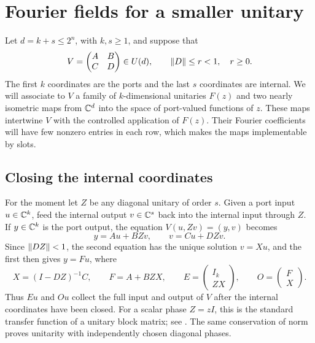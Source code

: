 \section{Fourier fields for a smaller unitary}\label{sec:fields}

Let $d=k+s\le 2^n$, with $k,s\ge1$, and suppose that
\begin{equation}\label{fields:block}
 V=\begin{pmatrix}A&B\\ C&D\end{pmatrix}\in U(d),
 \qquad \lVert D\rVert\le r<1,\quad r\ge0.
\end{equation}
The first $k$ coordinates are the ports and the last $s$ coordinates are
internal. We will associate to $V$ a family of $k$-dimensional unitaries
$F(z)$ and two nearly isometric maps from $\mathbb C^d$ into the space of
port-valued functions of $z$. These maps intertwine $V$ with the controlled
application of $F(z)$. Their Fourier coefficients will have few nonzero
entries in each row, which makes the maps implementable by slots.

\subsection{Closing the internal coordinates}

For the moment let $Z$ be any diagonal unitary of order $s$. Given a port
input $u\in\mathbb C^k$, feed the internal output $v\in\mathbb C^s$ back into the
internal input through $Z$. If $y\in\mathbb C^k$ is the port output, the equation
$V(u,Zv)=(y,v)$ becomes
\[
 y=Au+BZv,\qquad v=Cu+DZv.
\]
Since $\lVert DZ\rVert<1$, the second equation has the unique solution $v=Xu$,
and the first then gives $y=Fu$, where
\begin{equation}\label{fields:feedback}
 X=(I-DZ)^{-1}C,\qquad F=A+BZX,
 \qquad
 E=\begin{pmatrix}I_k\\ ZX\end{pmatrix},\qquad
 O=\begin{pmatrix}F\\ X\end{pmatrix}.
\end{equation}
Thus $Eu$ and $Ou$ collect the full input and output of $V$ after the
internal coordinates have been closed.
For a scalar phase $Z=zI$, this is the standard transfer function of a
unitary block matrix; see \cite[Section~3]{FKK2009}. The same conservation
of norm proves unitarity with independently chosen diagonal phases.

